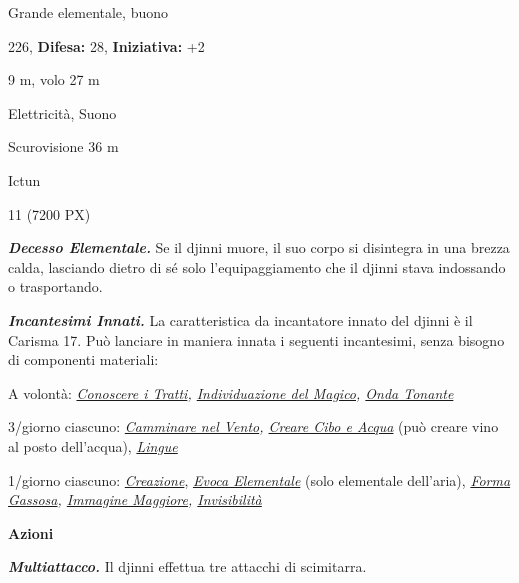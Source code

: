 \begin{multicols}{2}
{
\noindent
\begin{description}[noitemsep, topsep=0pt, parsep=0pt, partopsep=0pt, leftmargin=0cm, labelwidth=2.2cm]
	\item[\textbf{Taglia/Tipo:}] Grande elementale, buono
	\item[\textbf{Caratt.:}] 
	\item[\textbf{Punti Ferita:}] 226,  \textbf{Difesa:} 28,  \textbf{Iniziativa:} +2
	\item[\textbf{Movimento:}] 9 m, volo 27 m
	\item[\textbf{Tiri Salvez.:}] 
	\item[\textbf{Imm. Danni:}] Elettricità, Suono
	\item[\textbf{Sensi:}] Scurovisione 36 m
	\item[\textbf{Linguaggi:}] Ictun
	\item[\textbf{Sfida:}] 11 (7200 PX)\smallskip
\end{description}

\emph{\textbf{Decesso Elementale.}} Se il djinni muore, il suo corpo si disintegra in una brezza calda, lasciando dietro di sé solo l'equipaggiamento che il djinni stava indossando o trasportando.

\emph{\textbf{Incantesimi Innati.}} La caratteristica da incantatore innato del djinni è il Carisma 17. Può lanciare in maniera innata i seguenti incantesimi, senza bisogno di componenti materiali:

A volontà: \emph{\hyperlink{Conoscere i Tratti}{Conoscere i Tratti}, \hyperlink{Individuazione del Magico}{Individuazione del Magico}, \hyperlink{Onda Tonante}{Onda Tonante}}

3/giorno ciascuno: \emph{\hyperlink{Camminare nel Vento}{Camminare nel Vento}, \hyperlink{Creare Cibo e Acqua}{Creare Cibo e Acqua}} (può creare vino al posto dell'acqua), \emph{\hyperlink{Lingue}{Lingue}}

1/giorno ciascuno: \emph{\hyperlink{Creazione}{Creazione}}, \emph{\hyperlink{Evoca Elementale}{Evoca Elementale}} (solo elementale dell'aria), \emph{\hyperlink{Forma Gassosa}{Forma Gassosa}, \hyperlink{Immagine Maggiore}{Immagine Maggiore}, \hyperlink{Invisibilità}{Invisibilità}}

\textbf{Azioni}

\emph{\textbf{Multiattacco.}} Il djinni effettua tre attacchi di scimitarra.

}
\end{multicols}
